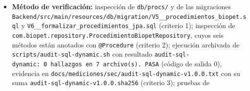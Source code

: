 \documentclass[
  spanish,
]{article}
\providecommand{\tightlist}{%
  \setlength{\itemsep}{0pt}\setlength{\parskip}{0pt}}
\begin{document}
\begin{itemize}
  \begin{enumerate}
  \def\labelenumi{\arabic{enumi}.}
  \tightlist
  \item
    Las seis rutinas de \texttt{db/\allowbreak{}procs/} son objetos PostgreSQL
    \texttt{PROCEDURE} versionados en el repositorio y aplicados por
    migraciones Flyway.
  \item
    Las seis se invocan desde Java exclusivamente con
    \texttt{@Procedure} (no con \texttt{@Query(native\allowbreak{}Query\ =\ true)} ni
    JDBC directo desde los servicios).
  \item
    El análisis \texttt{scripts/\allowbreak{}audit-\allowbreak{}sql-\allowbreak{}dynamic.\allowbreak{}sh} sobre los archivos
    de \texttt{db/\allowbreak{}procs/} devuelve 0 hallazgos de SQL dinámico
    construido por concatenación, con código de salida 0.
  \item
    Cada rutina tiene al menos una prueba de integración que la ejercita
    contra un PostgreSQL real.
  \item
    El catálogo documental de rutinas está completo: cada fila es
    trazable a un archivo \texttt{.\allowbreak{}sql} real del repositorio.
  \end{enumerate}
\item
  \textbf{Método de verificación:} inspección de \texttt{db/\allowbreak{}procs/} y de
  las migraciones
  \texttt{Backend/\allowbreak{}src/\allowbreak{}main/\allowbreak{}resources/\allowbreak{}db/\allowbreak{}migration/\allowbreak{}V5\_\allowbreak{}\_\allowbreak{}procedimientos\_\allowbreak{}b\allowbreak{}iopet.\allowbreak{}sql}
  y \texttt{V6\_\allowbreak{}\_\allowbreak{}formalizar\_\allowbreak{}proc\allowbreak{}edimientos\_\allowbreak{}jpa.\allowbreak{}sql} (criterio 1);
  inspección de
  \texttt{com.\allowbreak{}biopet.\allowbreak{}repository.\allowbreak{}Procedimiento\allowbreak{}Biopet\allowbreak{}Repository}, cuyos
  seis métodos están anotados con \texttt{@Procedure} (criterio 2);
  ejecución archivada de \texttt{scripts/\allowbreak{}audit-\allowbreak{}sql-\allowbreak{}dynamic.\allowbreak{}sh} con
  resultado
  \texttt{audit-\allowbreak{}sql-\allowbreak{}dynamic:\ 0\ hallazg\allowbreak{}os\ en\ 7\ archivo(s).\allowbreak{}\ PASA}
  (código de salida 0), evidencia en
  \texttt{docs/\allowbreak{}mediciones/\allowbreak{}sec/\allowbreak{}audit-\allowbreak{}sql-\allowbreak{}dynamic-\allowbreak{}v1.\allowbreak{}0.\allowbreak{}0.\allowbreak{}txt} con su suma
  \texttt{audit-\allowbreak{}sql-\allowbreak{}dynamic-\allowbreak{}v1.\allowbreak{}0.\allowbreak{}0.\allowbreak{}sha256} (criterio 3); pruebas de

\end{itemize}
\end{document}
